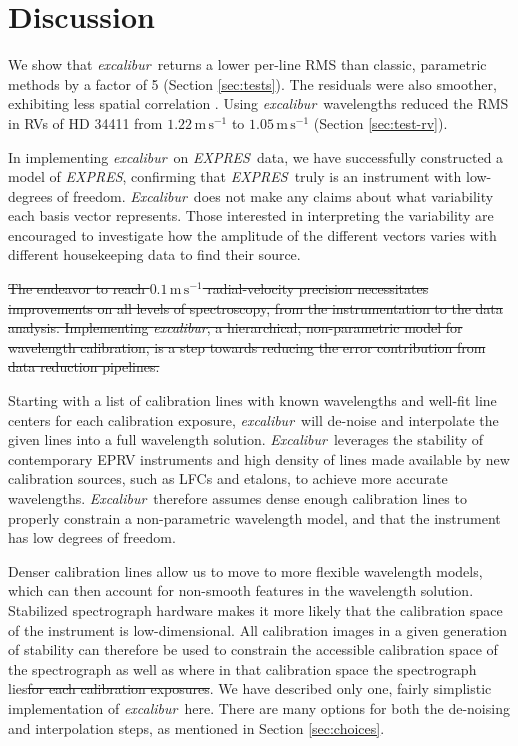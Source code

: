 \documentclass[twocolumn,table,xcolor,trackchanges]{aastex63} %
\newcommand{\project}[1]{\textsl{#1}}
\newcommand{\name}{\project{excalibur}}
\newcommand{\Name}{\project{Excalibur}}
\newcommand{\acronym}[1]{{\small{#1}}}
\newcommand{\expres}{\project{\acronym{EXPRES}}}
\newcommand{\mps}{\mathrm{m\,s^{-1}}}
\providecommand{\DIFadd}[1]{{\protect\color{blue}\uwave{#1}}} %
\providecommand{\DIFdel}[1]{{\protect\color{red}\sout{#1}}}                      %
\providecommand{\DIFaddbegin}{} %
\providecommand{\DIFaddend}{} %
\providecommand{\DIFdelbegin}{} %
\providecommand{\DIFdelend}{} %
\begin{document}
\section{Discussion} \label{sec:discussion}
We show that \name\ returns a lower per-line RMS than classic, parametric methods by a factor of 5 (Section \ref{sec:tests}).  The residuals were also smoother, exhibiting less spatial correlation \DIFaddbegin \DIFadd{(Figure \ref{fig:resid2d})}\DIFaddend .  Using \name\ wavelengths reduced the RMS in RVs of HD 34411 from \DIFdelbegin \DIFdel{$1.22\, \mps$ }\DIFdelend \DIFaddbegin \DIFadd{$1.17\, \mps$ }\DIFaddend to $1.05\, \mps$ (Section \ref{sec:test-rv}).

In implementing \name\ on \expres\ data, we have successfully constructed a model of \expres\DIFaddbegin \DIFadd{'s accessible calibration space}\DIFaddend , confirming that \expres\ truly is an instrument with low-degrees of freedom.  \Name\ does not make any claims about what variability each basis vector represents.  Those interested in interpreting the variability are encouraged to investigate how the amplitude of the different vectors varies with different housekeeping data to find their source.

\DIFdelbegin \DIFdel{The endeavor to reach $0.1\,\mps$ radial-velocity precision necessitates improvements on all levels of spectroscopy, from the instrumentation to the data analysis.  Implementing \name, a hierarchical, non-parametric model for wavelength calibration, is a step towards reducing the error contribution from data reduction pipelines.
}%

\DIFdelend Starting with a list of calibration lines with known wavelengths and well-fit line centers for each calibration exposure, \name\ will de-noise and interpolate the given lines into a full wavelength solution.  \Name\ leverages the stability of contemporary EPRV instruments and high density of lines made available by new calibration sources, such as LFCs and etalons, to achieve more accurate wavelengths.  \Name\ therefore assumes dense enough calibration lines to properly constrain a non-parametric wavelength model, and that the instrument has low degrees of freedom.

Denser calibration lines allow us to move to more flexible wavelength models, which can then account for non-smooth features in the wavelength solution.  Stabilized spectrograph hardware makes it more likely that the calibration space of the instrument is low-dimensional.  All calibration images in a given generation of stability can therefore be used to constrain the accessible calibration space of the spectrograph as well as where in that calibration space the spectrograph lies\DIFdelbegin \DIFdel{for each calibration exposures}\DIFdelend .  We have described only one, fairly simplistic implementation of \name\ here.  There are many options for both the de-noising and interpolation steps, as mentioned in Section \ref{sec:choices}.
\end{document}
